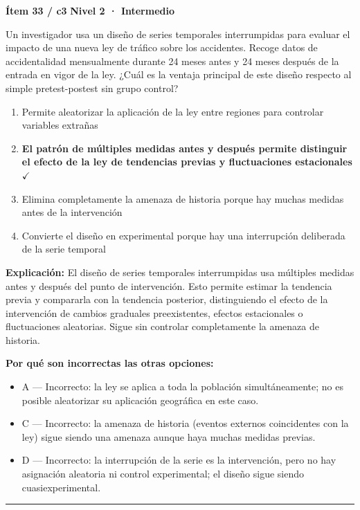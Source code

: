 \documentclass[12pt,a4paper]{article}
\begin{document}
\begin{mdframed}[backgroundcolor=fondogris,linecolor=ambar,linewidth=1pt,innerleftmargin=10pt,innerrightmargin=10pt,innertopmargin=7pt,innerbottommargin=7pt]
\textbf{Ítem 33 / c3} \hfill {\small\bfseries\color{ambar} Nivel 2 · Intermedio}
\end{mdframed}

Un investigador usa un diseño de series temporales interrumpidas para evaluar el impacto de una nueva ley de tráfico sobre los accidentes. Recoge datos de accidentalidad mensualmente durante 24 meses antes y 24 meses después de la entrada en vigor de la ley. ¿Cuál es la ventaja principal de este diseño respecto al simple pretest-postest sin grupo control?

\begin{enumerate}
  \item[A.] Permite aleatorizar la aplicación de la ley entre regiones para controlar variables extrañas
  \item[\textbf{\color{verde}B.}] \textbf{\color{verde} El patrón de múltiples medidas antes y después permite distinguir el efecto de la ley de tendencias previas y fluctuaciones estacionales} \hfill $\checkmark$
  \item[C.] Elimina completamente la amenaza de historia porque hay muchas medidas antes de la intervención
  \item[D.] Convierte el diseño en experimental porque hay una interrupción deliberada de la serie temporal
\end{enumerate}

\noindent\textbf{\color{azul}Explicación:} El diseño de series temporales interrumpidas usa múltiples medidas antes y después del punto de intervención. Esto permite estimar la tendencia previa y compararla con la tendencia posterior, distinguiendo el efecto de la intervención de cambios graduales preexistentes, efectos estacionales o fluctuaciones aleatorias. Sigue sin controlar completamente la amenaza de historia.

\noindent\textbf{\color{gris}Por qué son incorrectas las otras opciones:}
\begin{itemize}
  \item {\small A — Incorrecto: la ley se aplica a toda la población simultáneamente; no es posible aleatorizar su aplicación geográfica en este caso.}
  \item {\small C — Incorrecto: la amenaza de historia (eventos externos coincidentes con la ley) sigue siendo una amenaza aunque haya muchas medidas previas.}
  \item {\small D — Incorrecto: la interrupción de la serie es la intervención, pero no hay asignación aleatoria ni control experimental; el diseño sigue siendo cuasiexperimental.}
\end{itemize}
\vspace{8pt}\hrule\vspace{10pt}
\end{document}
